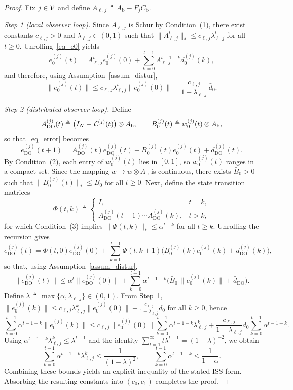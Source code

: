 \begin{proof}
Fix $j\in\mathcal{V}$ and define $A_{\ell,j}\triangleq A_{\text{b}}-F_jC_{\text{b}}$.

\textit{Step 1 (local observer loop).}
Since $A_{\ell,j}$ is Schur by Condition~(1), there exist constants $c_{\ell,j}>0$ and $\lambda_{\ell,j}\in(0,1)$ such that $\|A_{\ell,j}^t\|_* \le c_{\ell,j}\lambda_{\ell,j}^t$ for all $t\ge 0$.
Unrolling~\eqref{eq_e0} yields
\[
e_0^{(j)}(t)=A_{\ell,j}^t e_0^{(j)}(0)+\sum_{k=0}^{t-1}A_{\ell,j}^{t-1-k} d_0^{(j)}(k),
\]
and therefore, using Assumption~\ref{assum_distur},
\[
\|e_0^{(j)}(t)\|
\le c_{\ell,j}\lambda_{\ell,j}^t\|e_0^{(j)}(0)\|+\frac{c_{\ell,j}}{1-\lambda_{\ell,j}}\,\bar d_{0}.
\]

\textit{Step 2 (distributed observer loop).}
Define
\[
A_{\mathrm{DO}}^{(j)}(t)\triangleq \big(I_N-\bar{\mathcal{L}}^{(j)}(t)\big)\otimes A_{\text{b}},\qquad
B_{0}^{(j)}(t)\triangleq w_0^{(j)}(t)\otimes A_{\text{b}},
\]
so that~\eqref{eq_error} becomes
\[
e_{\mathrm{DO}}^{(j)}(t+1)=A_{\mathrm{DO}}^{(j)}(t)e_{\mathrm{DO}}^{(j)}(t)+B_{0}^{(j)}(t)e_0^{(j)}(t)+d_{\mathrm{DO}}^{(j)}(t).
\]
By Condition~(2), each entry of $w_0^{(j)}(t)$ lies in $[0,1]$, so $w_0^{(j)}(t)$ ranges in a compact set.
Since the mapping $w\mapsto w\otimes A_{\text{b}}$ is continuous, there exists $\bar B_0>0$ such that $\|B_0^{(j)}(t)\|_*\le \bar B_0$ for all $t\ge 0$.
Next, define the state transition matrices
\[
\Phi(t,k)\triangleq
\begin{cases}
I, & t=k,\\
A_{\mathrm{DO}}^{(j)}(t-1)\cdots A_{\mathrm{DO}}^{(j)}(k), & t>k,
\end{cases}
\]
for which Condition~(3) implies $\|\Phi(t,k)\|_* \le \alpha^{t-k}$ for all $t\ge k$.
Unrolling the recursion gives
\[
e_{\mathrm{DO}}^{(j)}(t)=\Phi(t,0)e_{\mathrm{DO}}^{(j)}(0)+\sum_{k=0}^{t-1}\Phi(t,k+1)\Big(B_{0}^{(j)}(k)e_0^{(j)}(k)+d_{\mathrm{DO}}^{(j)}(k)\Big),
\]
so that, using Assumption~\ref{assum_distur},
\[
\|e_{\mathrm{DO}}^{(j)}(t)\|
\le \alpha^t\|e_{\mathrm{DO}}^{(j)}(0)\|
\!+\!\sum_{k=0}^{t-1}\alpha^{t-1-k}\Big(\bar B_0\,\|e_0^{(j)}(k)\|+\bar d_{\mathrm{DO}}\Big).
\]
Define $\lambda\triangleq \max\{\alpha,\lambda_{\ell,j}\}\in(0,1)$.
From Step~1, $\|e_0^{(j)}(k)\|\le c_{\ell,j}\lambda_{\ell,j}^k\|e_0^{(j)}(0)\|+\frac{c_{\ell,j}}{1-\lambda_{\ell,j}}\bar d_{0}$ for all $k\ge 0$, hence
\[
\sum_{k=0}^{t-1}\alpha^{t-1-k}\|e_0^{(j)}(k)\|
\le c_{\ell,j}\|e_0^{(j)}(0)\|\sum_{k=0}^{t-1}\alpha^{t-1-k}\lambda_{\ell,j}^k
\!+\!\frac{c_{\ell,j}}{1-\lambda_{\ell,j}}\bar d_{0}\sum_{k=0}^{t-1}\alpha^{t-1-k}.
\]
Using $\alpha^{t-1-k}\lambda_{\ell,j}^k\le \lambda^{t-1}$ and the identity $\sum_{t=1}^{\infty} t\lambda^{t-1}=(1-\lambda)^{-2}$, we obtain
\[
\sum_{k=0}^{t-1}\alpha^{t-1-k}\lambda_{\ell,j}^k \le \frac{1}{(1-\lambda)^2},
\qquad
\sum_{k=0}^{t-1}\alpha^{t-1-k}\le \frac{1}{1-\alpha}.
\]
Combining these bounds yields an explicit inequality of the stated ISS form. Absorbing the resulting constants into $(c_0,c_1)$ completes the proof.
\end{proof}


